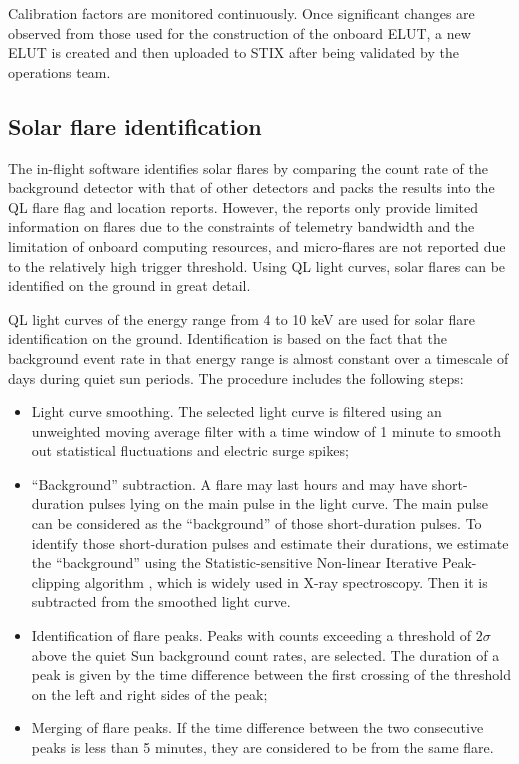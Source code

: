 \documentclass[referee]{aa} %
\begin{document}
Calibration factors are monitored continuously. Once significant changes are 
observed from those used for the construction of  the onboard ELUT, 
 a new ELUT is created and then uploaded to STIX after being validated by the operations team. 

\subsection{Solar flare identification}
The in-flight software identifies solar flares by comparing  the count rate of 
the background detector with that of other detectors 
 and packs the results into the QL flare flag and location reports.
However,  the reports only provide limited information on flares due to the constraints of telemetry 
bandwidth and the limitation of onboard computing resources, and micro-flares are not 
reported due to the relatively high trigger threshold.
Using QL light curves, solar flares can be identified on the ground in great detail.

QL light curves of the energy range from  4 to 10 keV are used for solar flare identification
on the ground. Identification is based on the fact 
that the background event rate in that energy range is almost constant 
over a timescale of days during quiet sun periods. 
The procedure includes the following steps:
\begin{itemize}
  \item Light curve smoothing. The selected light curve is filtered using an unweighted
  moving average filter with a time window of 1 minute to smooth out statistical fluctuations and electric surge spikes;
  \item “Background” subtraction.  
   A flare may last hours and may have short-duration pulses lying on the main pulse in the light curve.
   The main pulse can be considered as the “background” of those short-duration pulses.
  To identify those short-duration pulses and estimate their durations, 
  we estimate the “background”  using the Statistic-sensitive Non-linear Iterative Peak-clipping algorithm \cite{sinp}, which is widely used in X-ray spectroscopy.
    Then it is subtracted from the smoothed light curve.
  \item Identification of flare peaks. Peaks with counts exceeding a threshold of $2\sigma$ 
  above the quiet Sun background count rates,  
   are selected. The duration of a peak is given by the time difference between the first 
   crossing of the threshold on the left and right sides of the peak;  
  \item Merging of flare peaks. If the time difference between the two consecutive peaks is less than 5 minutes,
   they are considered to be from the same flare.
\end{itemize}
\end{document}
